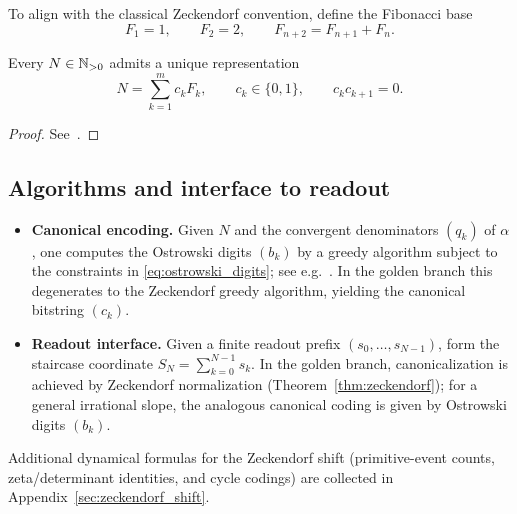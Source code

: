 To align with the classical Zeckendorf convention, define the Fibonacci base
$$
F_1=1,\qquad F_2=2,\qquad F_{n+2}=F_{n+1}+F_n.
$$

\begin{theorem}
\label{thm:zeckendorf}
Every $N\in\mathbb{N}_{>0}$ admits a unique representation
$$
N=\sum_{k=1}^{m} c_k F_k,
\qquad c_k\in\{0,1\},\qquad c_k c_{k+1}=0.
$$
\end{theorem}

\begin{proof}
See~\cite{Zeckendorf1972}.
\end{proof}

\subsection{Algorithms and interface to readout}
\begin{itemize}
    \item \textbf{Canonical encoding.} Given $N$ and the convergent denominators $(q_k)$ of $\alpha$, one computes the Ostrowski digits $(b_k)$ by a greedy algorithm subject to the constraints in \eqref{eq:ostrowski_digits}; see e.g.~\cite{AlloucheShallit2003,Lothaire2002}. In the golden branch this degenerates to the Zeckendorf greedy algorithm, yielding the canonical bitstring $(c_k)$.
    \item \textbf{Readout interface.} Given a finite readout prefix $(s_0,\dots,s_{N-1})$, form the staircase coordinate $S_N=\sum_{k=0}^{N-1}s_k$. In the golden branch, canonicalization is achieved by Zeckendorf normalization (Theorem~\ref{thm:zeckendorf}); for a general irrational slope, the analogous canonical coding is given by Ostrowski digits $(b_{k})$.
\end{itemize}

\noindent Additional dynamical formulas for the Zeckendorf shift (primitive-event counts, zeta/determinant identities, and cycle codings) are collected in Appendix~\ref{sec:zeckendorf_shift}.
